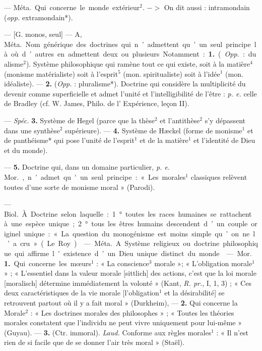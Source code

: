 \begin{itemize}[leftmargin=1cm, label=, itemsep=1pt]
 — \si{Méta.} Qui concerne le
monde extérieur$^2$. $->$ On dit aussi :
intramondain ({\it opp.} extramondain*).

 — [G. monos, seul] — A, \si{Méta.}
Nom générique des doctrines qui
n’admettent qu’un seul principe là
où d’autres en admettent deux ou
plusieurs. Notamment : {\bf 1.} ({\it Opp.} :
dualisme$^2$). Système philosophique
qui ramène tout ce qui existe, soit
à la matière$^4$ (monisme matérialiste) soit à l’esprit$^5$ (mon. spiritualiste) soit à l’idée$^1$ (mon. idéaliste).
— {\bf 2.} ({\it Opp.} : pluralisme*). Doctrine
qui considère la multiplicité du
devenir comme superficielle et admet
l'unité et l’intelligibilité de l’être :
{\it p. e.} celle de Bradley (cf. W. James,
Philo. de l’ Expérience, leçon II).

— {\it Spéc.} {\bf 3.} Système de Hegel
(parce que la thèse$^2$ et l’antithèse$^2$
s'y dépassent dans une synthèse$^2$
supérieure). — {\bf 4.} Système de Hæckel
(forme de monisme$^1$ et de panthéisme* qui pose l’unité de l'esprit$^1$
et de la matière$^1$ et l'identité de
Dieu et du monde).

— {\bf 5.} Doctrine qui, dans un domaine particulier, {\it p. e.} \si{Mor.}, n’admet
qu'un seul principe : « Les morales$^1$
classiques relèvent toutes d’une
sorte de monisme moral » (Parodi).

 — \si{Biol.} À. Doctrine
selon laquelle : 1° toutes les races
humaines se rattachent à une espèce
unique; 2° tous les êtres humains
descendent d’un couple originel
unique : « La question du monogénisme est moins simple qu’on ne l’a
cru » (Le Roy).

 — \si{Méta.} A. Système
religieux ou doctrine philosophique
qui affirme l'existence d’un Dieu
unique distinct du monde.

 — \si{Mor.} {\bf 1.} Qui concerne les
mœurs$^1$ : « La conscience$^3$ morale »;
« L'obligation morale$^1$ » ; « L’essentiel dans la valeur morale [sittlich]
des actions, c’est que la loi morale
[moralisch] détermine immédiatement la volonté » (Kant, {\it R. pr.}, I,
1, 3) ; « Ces deux caractéristiques de
la vie morale [l’obligation$^1$ et la désirabilité] se retrouvent partout où il
y a fait moral » (Durkheim), — {\bf 2.}
Qui concerne la Morale$^2$ : « Les doctrines morales des philosophes » ;
« Toutes les théories morales constatent que l'individu ne peut vivre
uniquement pour lui-même »
(Guyau). — {\bf 3.} (Ctr. immoral).
{\it Laud.} Conforme aux règles morales$^1$ :
« Il n’est rien de si facile que de se
donner l'air très moral » (Staël).


\end{itemize}
